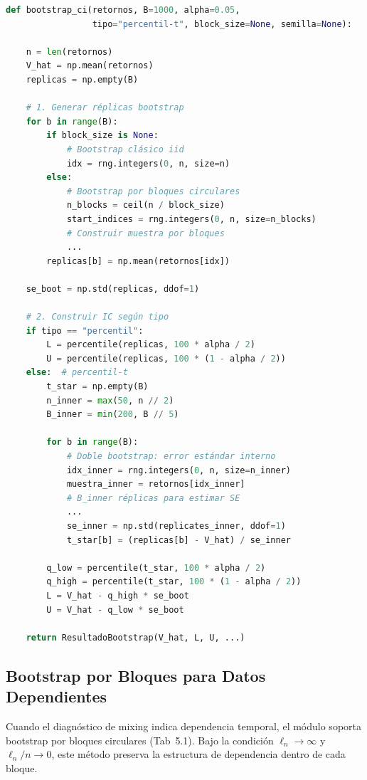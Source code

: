 \documentclass[12pt,a4paper]{article}
\begin{document}
\begin{lstlisting}[caption={Algoritmo de bootstrap completo (código simplificado)}, label=alg:bootstrap, language=Python]
def bootstrap_ci(retornos, B=1000, alpha=0.05,
                 tipo="percentil-t", block_size=None, semilla=None):

    n = len(retornos)
    V_hat = np.mean(retornos)
    replicas = np.empty(B)

    # 1. Generar réplicas bootstrap
    for b in range(B):
        if block_size is None:
            # Bootstrap clásico iid
            idx = rng.integers(0, n, size=n)
        else:
            # Bootstrap por bloques circulares
            n_blocks = ceil(n / block_size)
            start_indices = rng.integers(0, n, size=n_blocks)
            # Construir muestra por bloques
            ...
        replicas[b] = np.mean(retornos[idx])

    se_boot = np.std(replicas, ddof=1)

    # 2. Construir IC según tipo
    if tipo == "percentil":
        L = percentile(replicas, 100 * alpha / 2)
        U = percentile(replicas, 100 * (1 - alpha / 2))
    else:  # percentil-t
        t_star = np.empty(B)
        n_inner = max(50, n // 2)
        B_inner = min(200, B // 5)

        for b in range(B):
            # Doble bootstrap: error estándar interno
            idx_inner = rng.integers(0, n, size=n_inner)
            muestra_inner = retornos[idx_inner]
            # B_inner réplicas para estimar SE
            ...
            se_inner = np.std(replicates_inner, ddof=1)
            t_star[b] = (replicas[b] - V_hat) / se_inner

        q_low = percentile(t_star, 100 * alpha / 2)
        q_high = percentile(t_star, 100 * (1 - alpha / 2))
        L = V_hat - q_high * se_boot
        U = V_hat - q_low * se_boot

    return ResultadoBootstrap(V_hat, L, U, ...)
\end{lstlisting}

\subsection{Bootstrap por Bloques para Datos Dependientes}

Cuando el diagnóstico de mixing indica dependencia temporal, el módulo soporta bootstrap por bloques circulares (Tab~5.1). Bajo la condición $\ell_n \to \infty$ y $\ell_n / n \to 0$, este método preserva la estructura de dependencia dentro de cada bloque.
\end{document}
